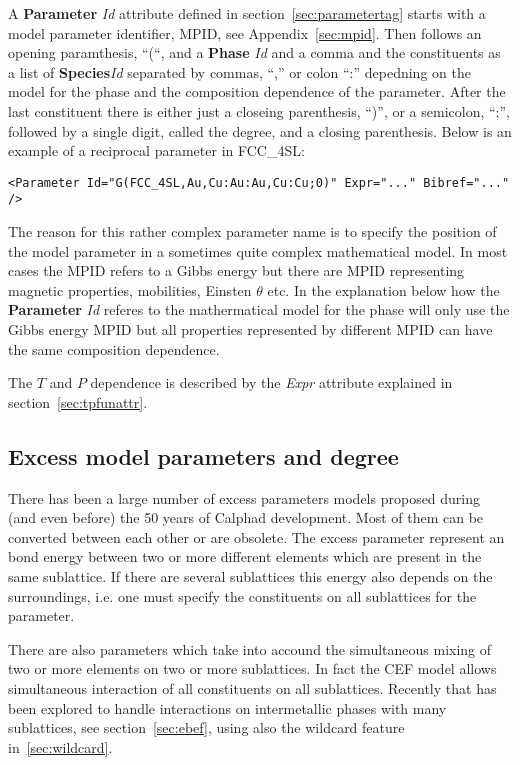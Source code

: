 \documentclass{article}
\begin{document}
\begin{appendices}
A {\bf Parameter} {\em Id} attribute defined in
section~\ref{sec:parametertag} starts with a model parameter
identifier, MPID, see Appendix~\ref{sec:mpid}.  Then follows an
opening paramthesis, ``(``, and a {\bf Phase} {\em Id} and a comma and
the constituents as a list of {\bf Species}{\em Id} separated by
commas, ``,'' or colon ``:'' depedning on the model for the phase and
the composition dependence of the parameter.  After the last
constituent there is either just a closeing parenthesis, ``)'', or a
semicolon, ``;'', followed by a single digit, called the degree, and a
closing parenthesis.  Below is an example of a reciprocal parameter in
FCC\_4SL:

{\large
\begin{verbatim}
<Parameter Id="G(FCC_4SL,Au,Cu:Au:Au,Cu:Cu;0)" Expr="..." Bibref="..." />
\end{verbatim}
}

The reason for this rather complex parameter name is to specify the
position of the model parameter in a sometimes quite complex
mathematical model.  In most cases the MPID refers to a Gibbs energy
but there are MPID representing magnetic properties, mobilities,
Einsten $\theta$ etc.  In the explanation below how the {\bf
  Parameter} {\em Id} referes to the mathermatical model for the phase
will only use the Gibbs energy MPID but all properties represented by
different MPID can have the same composition dependence.

The $T$ and $P$ dependence is described by the {\em Expr} attribute
explained in section~\ref{sec:tpfunattr}.


\subsection{Excess model parameters and degree}\label{sec:degree}\label{sec:rkorder}

There has been a large number of excess parameters models proposed
during (and even before) the 50 years of Calphad development.  Most of
them can be converted between each other or are obsolete.  The excess
parameter represent an bond energy between two or more different
elements which are present in the same sublattice.  If there are
several sublattices this energy also depends on the surroundings,
i.e. one must specify the constituents on all sublattices for the
parameter.

There are also parameters which take into accound the simultaneous
mixing of two or more elements on two or more sublattices.  In fact
the CEF model allows simultaneous interaction of all constituents on
all sublattices.  Recently that has been explored to handle
interactions on intermetallic phases with many sublattices, see
section~\ref{sec:ebef}, using also the wildcard feature
in~\ref{sec:wildcard}.


\end{appendices}
\end{document}
